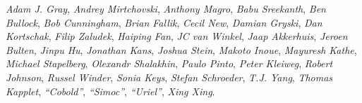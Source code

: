 \emph{Adam J. Gray},
\emph{Andrey Mirtchovski},
\emph{Anthony Magro},
\emph{Babu Sreekanth},
\emph{Ben Bullock},
\emph{Bob Cunningham},
\emph{Brian Fallik},
\emph{Cecil New},
\emph{Damian Gryski},
\emph{Dan Kortschak},
\emph{Filip Zaludek},
\emph{Haiping Fan},
\emph{JC van Winkel},
\emph{Jaap Akkerhuis},
\emph{Jeroen Bulten},
\emph{Jinpu Hu},
\emph{Jonathan Kans},
\emph{Joshua Stein},
\emph{Makoto Inoue},
\emph{Mayuresh Kathe},
\emph{Michael Stapelberg},
\emph{Olexandr Shalakhin},
\emph{Paulo Pinto},
\emph{Peter Kleiweg},
\emph{Robert Johnson},
\emph{Russel Winder},
\emph{Sonia Keys},
\emph{Stefan Schroeder},
\emph{T.J. Yang},
\emph{Thomas Kapplet},
\emph{``Cobold''},
\emph{``Simoc''},
\emph{``Uriel''},
\emph{Xing Xing}.
